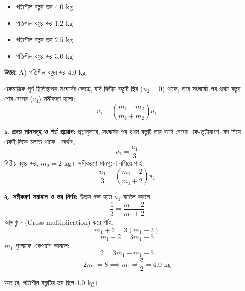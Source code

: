\documentclass[12pt, a4paper]{article}
\begin{document}
\begin{itemize}[label={}, leftmargin=1cm, itemsep=0.5em]
\item[\textbf{A)}] গতিশীল বস্তুর ভর $4.0\text{ kg}$
\item[\textbf{B)}] গতিশীল বস্তুর ভর $1.2\text{ kg}$
\item[\textbf{C)}] গতিশীল বস্তুর ভর $2.5\text{ kg}$
\item[\textbf{D)}] গতিশীল বস্তুর ভর $3.0\text{ kg}$
\end{itemize}

\vspace{0.5em}
\begin{tcolorbox}[answerbox]
\textbf{\color{success} উত্তর:} A) গতিশীল বস্তুর ভর $4.0\text{ kg}$
\end{tcolorbox}
\vspace{1em}

\begin{tcolorbox}[solutionbox={সমাধান (Solution)}]
\noindent
একমাত্রিক পূর্ণ স্থিতিস্থাপক সংঘর্ষের ক্ষেত্রে, যদি দ্বিতীয় বস্তুটি স্থির ($u_2 = 0$) থাকে, তবে সংঘর্ষের পর প্রথম বস্তুর শেষ বেগের ($v_1$) সমীকরণ হলো:
$$v_1 = \left(\frac{m_1 - m_2}{m_1 + m_2}\right) u_1$$

\vspace{0.5em}
\textbf{১. প্রদত্ত মানসমূহ ও শর্ত প্রয়োগ:}
প্রশ্নানুসারে, সংঘর্ষের পর প্রথম বস্তুটি তার আদি বেগের এক-তৃতীয়াংশ বেগ নিয়ে একই দিকে চলতে থাকে। অর্থাৎ,
$$v_1 = \frac{u_1}{3}$$
দ্বিতীয় বস্তুর ভর, $m_2 = 2\text{ kg}$।
সমীকরণে মানগুলো বসিয়ে পাই:
$$\frac{u_1}{3} = \left(\frac{m_1 - 2}{m_1 + 2}\right) u_1$$

\vspace{0.5em}
\textbf{২. সমীকরণ সমাধান ও ভর নির্ণয়:}
উভয় পক্ষ হতে $u_1$ বাতিল করলে:
$$\frac{1}{3} = \frac{m_1 - 2}{m_1 + 2}$$
আড়গুণন (Cross-multiplication) করে পাই:
$$m_1 + 2 = 3(m_1 - 2)$$
$$m_1 + 2 = 3m_1 - 6$$
$m_1$ গুলোকে একপাশে আনলে:
$$2 = 3m_1 - m_1 - 6$$
$$2m_1 = 8 \implies m_1 = \frac{8}{2} = 4.0\text{ kg}$$

অতএব, গতিশীল বস্তুটির ভর ছিল $4.0\text{ kg}$।
\end{tcolorbox}
\vspace{2em}
\end{document}
